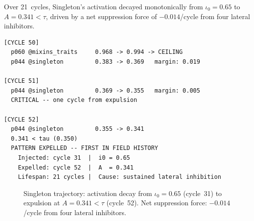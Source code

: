 Over 21~cycles, Singleton's activation decayed monotonically from
$\iota_0 = 0.65$ to $A = 0.341 < \tau$, driven by a net suppression
force of $-0.014$/cycle from four lateral inhibitors.

\begin{terminalbox}
\begin{lstlisting}[style=neosshell]
[CYCLE 50]
  p060 @mixins_traits     0.968 -> 0.994 -> CEILING
  p044 @singleton         0.383 -> 0.369   margin: 0.019

[CYCLE 51]
  p044 @singleton         0.369 -> 0.355   margin: 0.005
  CRITICAL -- one cycle from expulsion

[CYCLE 52]
  p044 @singleton         0.355 -> 0.341
  0.341 < tau (0.350)
  PATTERN EXPELLED -- FIRST IN FIELD HISTORY
    Injected: cycle 31  |  i0 = 0.65
    Expelled: cycle 52  |  A  = 0.341
    Lifespan: 21 cycles |  Cause: sustained lateral inhibition
\end{lstlisting}
\end{terminalbox}

\begin{figure}[htbp]
\centering
{}
\caption{Singleton trajectory: activation decay from $\iota_0 = 0.65$
  (cycle~31) to expulsion at $A = 0.341 < \tau$ (cycle~52).  Net
  suppression force: $-0.014$/cycle from four lateral inhibitors.}
\label{fig:singleton-trajectory}
\end{figure}

